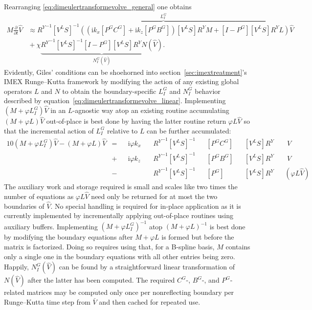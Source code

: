 \documentclass[letterpaper,11pt,nointlimits,reqno,draft]{amsbook}
\newcommand{\ii}{\ensuremath{\mathrm{i}}}
\begin{document}
Rearranging \eqref{eq:dimeulertransformevolve_general} one obtains
\begin{align}
\label{eq:dimeulertransformevolve_linear}
  M \frac{\partial}{\partial{}t}
  \hat{V}
&\approx
\overbrace{
  {R^Y}^{-1}
  \left[V^L S\right]^{-1}
  \left(
    \left( \ii k_x \left[P^G C^G\right] + \ii k_z \left[P^G B^G\right] \right)
    \left[V^L S\right] R^Y M
    +
    \left[I-P^G\right] \left[V^L S\right] R^Y
    L
  \right)
}^{L_I^G}
  \hat{V}
\\
&{}+
  \chi
\underbrace{
  {R^Y}^{-1}
  \left[V^L S\right]^{-1}
  \left[I - P^G\right] \left[V^L S\right] R^Y
  N(\hat{V})
}_{N_I^G\left(\hat{V}\right)}
.
\end{align}
Evidently, Giles' conditions can be shoehorned into
section~\ref{sec:imextreatment}'s IMEX Runge--Kutta framework by modifying the
action of any existing global operators $L$ and $N$ to obtain the
boundary-specific $L_I^G$ and $N_I^G$ behavior described by
equation~\eqref{eq:dimeulertransformevolve_linear}.  Implementing
$\left(M+\varphi{}L_I^G\right)\hat{V}$ in an $L$-agnostic way atop an existing
routine accumulating $\left(M+\varphi{}L\right)\hat{V}$ out-of-place is best
done by having the latter routine return $\varphi{}L\hat{V}$ so that the
incremental action of $L_I^G$ relative to $L$ can be further accumulated:
\begin{alignat}{10}
\left(M+\varphi{}L_I^G\right)\hat{V} - \left(M+\varphi{}L\right)\hat{V}
  &={}   &&\ii \varphi{} k_x \, &&{R^Y}^{-1} \left[V^L S\right]^{-1} &&\left[P^G C^G\right] &&\left[V^L S\right] {R^Y} &&\,\,\hat{V} \\
  &{}+{} &&\ii \varphi{} k_z    &&{R^Y}^{-1} \left[V^L S\right]^{-1} &&\left[P^G B^G\right] &&\left[V^L S\right] {R^Y} &&\,\,\hat{V} \\
  &{}-{} &&                     &&{R^Y}^{-1} \left[V^L S\right]^{-1} &&\left[P^G    \right] &&\left[V^L S\right] {R^Y} &&\left(\varphi{}L\hat{V}\right)
\end{alignat}
The auxiliary work and storage required is small and scales like two times the
number of equations as $\varphi{}L\hat{V}$ need only be returned for at most
the two boundaries of $\hat{V}$.  No special handling is required for in-place
application as it is currently implemented by incrementally applying
out-of-place routines using auxiliary buffers.  Implementing
$\left(M+\varphi{}L_I^G\right)^{-1}$ atop $\left(M+\varphi{}L\right)^{-1}$ is
best done by modifying the boundary equations after $M+\varphi{}L$ is formed
but before the matrix is factorized.  Doing so requires using that, for a
B-spline basis, $M$ contains only a single one in the boundary equations with
all other entries being zero.  Happily, $N_I^G(\hat{V})$ can be found by a
straightforward linear transformation of $N(\hat{V})$ after the latter has been
computed.  The required $C^G$-, $B^G$-, and $P^G$-related matrices may be
computed only once per nonreflecting boundary per Runge--Kutta time step from
$\bar{V}$ and then cached for repeated use.
\end{document}
